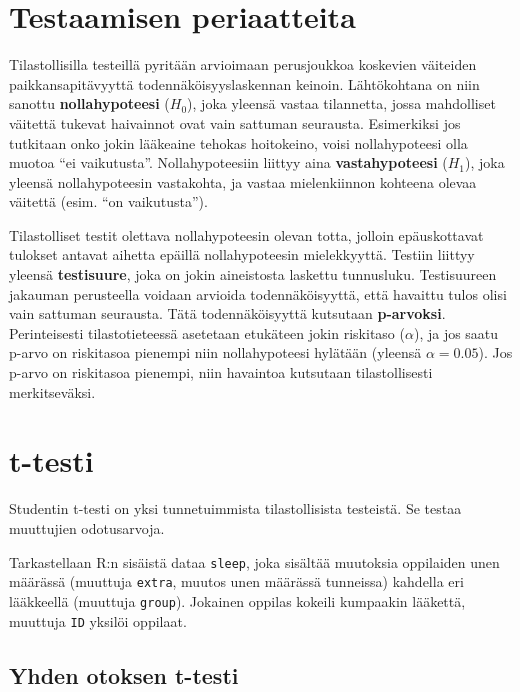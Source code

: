 \documentclass[
]{book}
\begin{document}
\hypertarget{testaamisen-periaatteita}{%
\section{Testaamisen periaatteita}\label{testaamisen-periaatteita}}

Tilastollisilla testeillä pyritään arvioimaan perusjoukkoa koskevien väiteiden paikkansapitävyyttä todennäköisyyslaskennan keinoin. Lähtökohtana on niin sanottu \textbf{nollahypoteesi} (\(H_0\)), joka yleensä vastaa tilannetta, jossa mahdolliset väitettä tukevat haivainnot ovat vain sattuman seurausta. Esimerkiksi jos tutkitaan onko jokin lääkeaine tehokas hoitokeino, voisi nollahypoteesi olla muotoa ``ei vaikutusta''. Nollahypoteesiin liittyy aina \textbf{vastahypoteesi} (\(H_1\)), joka yleensä nollahypoteesin vastakohta, ja vastaa mielenkiinnon kohteena olevaa väitettä (esim. ``on vaikutusta'').

Tilastolliset testit olettava nollahypoteesin olevan totta, jolloin epäuskottavat tulokset antavat aihetta epäillä nollahypoteesin mielekkyyttä. Testiin liittyy yleensä \textbf{testisuure}, joka on jokin aineistosta laskettu tunnusluku. Testisuureen jakauman perusteella voidaan arvioida todennäköisyyttä, että havaittu tulos olisi vain sattuman seurausta. Tätä todennäköisyyttä kutsutaan \textbf{p-arvoksi}. Perinteisesti tilastotieteessä asetetaan etukäteen jokin riskitaso (\(\alpha\)), ja jos saatu p-arvo on riskitasoa pienempi niin nollahypoteesi hylätään (yleensä \(\alpha = 0.05\)). Jos p-arvo on riskitasoa pienempi, niin havaintoa kutsutaan tilastollisesti merkitseväksi.

\hypertarget{t-test}{%
\section{t-testi}\label{t-test}}

Studentin t-testi on yksi tunnetuimmista tilastollisista testeistä. Se testaa muuttujien odotusarvoja.

Tarkastellaan R:n sisäistä dataa \texttt{sleep}, joka sisältää muutoksia oppilaiden unen määrässä (muuttuja \texttt{extra}, muutos unen määrässä tunneissa) kahdella eri lääkkeellä (muuttuja \texttt{group}). Jokainen oppilas kokeili kumpaakin lääkettä, muuttuja \texttt{ID} yksilöi oppilaat.

\hypertarget{yhden-otoksen-t-testi}{%
\subsection{Yhden otoksen t-testi}\label{yhden-otoksen-t-testi}}
\end{document}
